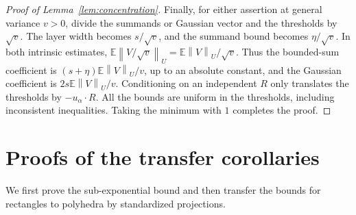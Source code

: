 \documentclass[11pt,letterpaper]{article}
\newenvironment{recovered}{\color{magenta}}{}
\theoremstyle{remark}
\newcommand{\E}{\mathbb E}
\newcommand{\norm}[1]{\left\lVert#1\right\rVert}
\begin{document}
\begin{proof}[Proof of Lemma~\ref{lem:concentration}]
Finally, for either assertion at general variance \(v>0\), divide
the summands or Gaussian vector and the thresholds by \(\sqrt v\).
The layer width becomes \(s/\sqrt v\), and the summand bound becomes
\(\eta/\sqrt v\). In both intrinsic estimates,
\(\E\norm{V/\sqrt v}_U=\E\norm{V}_U/\sqrt v\). Thus the
bounded-sum coefficient is \((s+\eta)\E\norm{V}_U/v\), up to
an absolute constant, and the Gaussian coefficient is
\(2s\E\norm{V}_U/v\).
Conditioning on an independent \(R\) only
translates the thresholds by \(-u_\alpha\cdot R\). All the bounds
are uniform in the thresholds, including inconsistent inequalities.
Taking the minimum with \(1\) completes the proof.
\end{proof}


\section{Proofs of the transfer corollaries}\label{app:transfers}

\begin{recovered}
We first prove the sub-exponential bound and then transfer the bounds
for rectangles to polyhedra by standardized projections.
\end{recovered}
\end{document}
